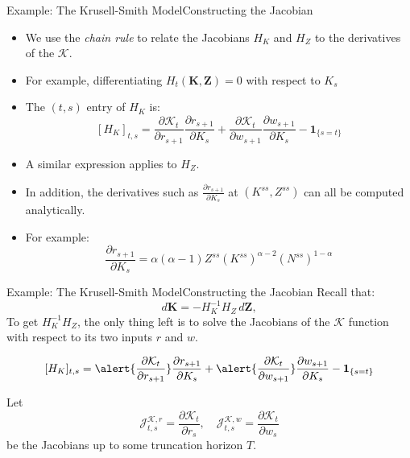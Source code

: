 \documentclass[aspectratio=169]{beamer}
\begin{document}
\begin{frame}{Example: The Krusell-Smith Model}{Constructing the Jacobian}
    \begin{itemize}
        \item  We use the \emph{chain rule} to relate the Jacobians $H_K$ and $H_Z$ to the derivatives of the $\mathcal{K}$.
        \item For example, differentiating $H_t(\bm{K},\bm{Z})=0$ with respect to $K_s$
        \item     The $(t, s)$ entry of $H_K$ is:
              \[
                  [H_K]_{t,s} = \frac{\partial \mathcal{K}_t}{\partial r_{s+1}} \frac{\partial r_{s+1}}{\partial K_s}
                  + \frac{\partial \mathcal{K}_t}{\partial w_{s+1}} \frac{\partial w_{s+1}}{\partial K_s} - \bm{1}_{\{s = t\}}
              \]

        \item A similar expression applies to $H_Z$.
        \item In addition, the derivatives such as $\frac{\partial r_{s+1}}{\partial K_s}$ at $(K^{ss}, Z^{ss})$ can all be computed analytically.
        \item For example:
              \[
                  \frac{\partial r_{s+1}}{\partial K_s} = \alpha(\alpha - 1) Z^{ss} (K^{ss})^{\alpha-2} (N^{ss})^{1-\alpha}
              \]

    \end{itemize}
\end{frame}



\begin{frame}{Example: The Krusell-Smith Model}{Constructing the Jacobian}
    Recall that:
    \[
        d\bm{K} = - H_K^{-1} H_Z \, d\bm{Z},
    \]
    To get $H_K^{-1} H_Z $, the only thing left is to solve the Jacobians of the $\mathcal{K}$ function with
    respect to its two inputs $r$ and $w$.


    \[
        [H_K]_{t,s} =\alert{ \frac{\partial \mathcal{K}_t}{\partial r_{s+1}} }\frac{\partial r_{s+1}}{\partial K_s}
        + \alert{ \frac{\partial \mathcal{K}_t}{\partial w_{s+1}} } \frac{\partial w_{s+1}}{\partial K_s} - \bm{1}_{\{s = t\}}
    \]

    Let \[\mathcal{J}_{t,s}^{\mathcal{K},r}=\frac{\partial\mathcal{K}_t}{\partial r_s},\quad\mathcal{J}_{t,s}^{\mathcal{K},w}=\frac{\partial\mathcal{K}_t}{\partial w_s}\] be the Jacobians up to some truncation horizon $T$.



\end{frame}
\end{document}
